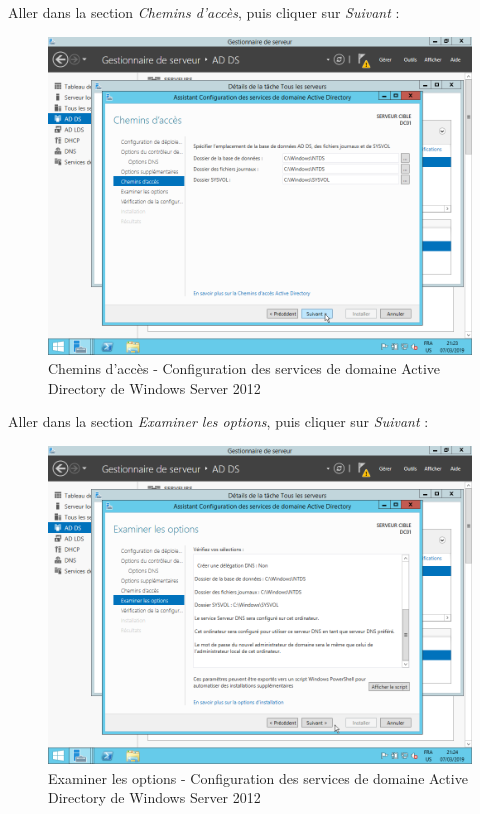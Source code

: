\newpage
Aller dans la section \textit{Chemins d'accès}, puis cliquer sur \textit{Suivant} :
\begin{figure}[h!]
    \begin{center}
        \includegraphics[scale=0.6]{WS2012_Screenshots/62.png}
        \caption{Chemins d'accès - Configuration des services de domaine Active Directory de Windows Server 2012}
        \label{WS2012_Screenshots/62}
    \end{center}
\end{figure}
\FloatBarrier

\newpage
Aller dans la section \textit{Examiner les options}, puis cliquer sur \textit{Suivant} :
\begin{figure}[h!]
    \begin{center}
        \includegraphics[scale=0.6]{WS2012_Screenshots/63.png}
        \caption{Examiner les options - Configuration des services de domaine Active Directory de Windows Server 2012}
        \label{WS2012_Screenshots/63}
    \end{center}
\end{figure}
\FloatBarrier

